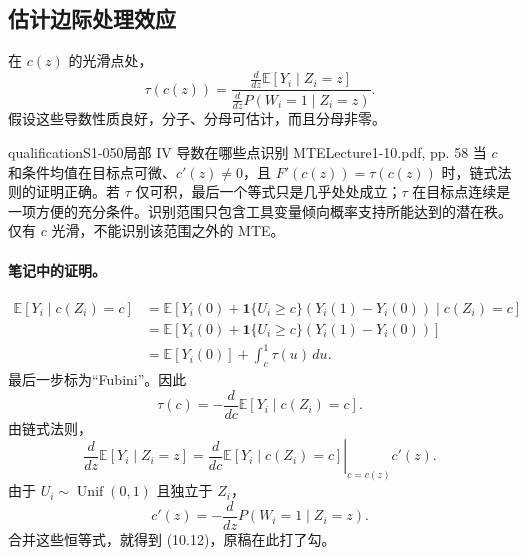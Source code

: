 \subsection{估计边际处理效应}
在 $c(z)$ 的光滑点处，
\[
 \tau(c(z))=
 \frac{\displaystyle\frac d{dz}\mathbb E[Y_i\mid Z_i=z]}
 {\displaystyle\frac d{dz}P(W_i=1\mid Z_i=z)}.\tag{10.12}
\]
假设这些导数性质良好，分子、分母可估计，而且分母非零。
\begin{reviewnote}{qualification}{S1-050}{局部 IV 导数在哪些点识别 MTE}{Lecture1-10.pdf, pp. 58}
当 $c$ 和条件均值在目标点可微、$c'(z)\ne0$，且 $F'(c(z))=\tau(c(z))$ 时，链式法则的证明正确。若 $\tau$ 仅可积，最后一个等式只是几乎处处成立；$\tau$ 在目标点连续是一项方便的充分条件。识别范围只包含工具变量倾向概率支持所能达到的潜在秩。仅有 $c$ 光滑，不能识别该范围之外的 MTE。
\end{reviewnote}


\paragraph{笔记中的证明。}
\begin{align*}
 \mathbb E[Y_i\mid c(Z_i)=c]
 &=\mathbb E[Y_i(0)+\mathbf1\{U_i\ge c\}(Y_i(1)-Y_i(0))
 \mid c(Z_i)=c]\\
 &=\mathbb E[Y_i(0)+\mathbf1\{U_i\ge c\}(Y_i(1)-Y_i(0))]\\
 &=\mathbb E[Y_i(0)]+\int_c^1\tau(u)\,du.
\end{align*}
最后一步标为“Fubini”。因此
\[
 \tau(c)=-\frac d{dc}\mathbb E[Y_i\mid c(Z_i)=c].
\]
由链式法则，
\[
 \frac d{dz}\mathbb E[Y_i\mid Z_i=z]
 =\left.\frac d{dc}\mathbb E[Y_i\mid c(Z_i)=c]\right|_{c=c(z)}c'(z).
\]
由于 $U_i\sim\operatorname{Unif}(0,1)$ 且独立于 $Z_i$，
\[
 c'(z)=-\frac d{dz}P(W_i=1\mid Z_i=z).
\]
合并这些恒等式，就得到 (10.12)，原稿在此打了勾。
